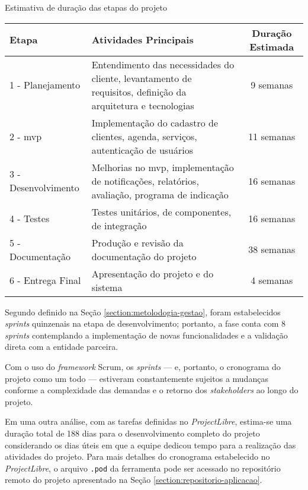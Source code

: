 \begin{quadro}[ht]
	\setlength{\tabcolsep}{5pt}
	\begin{center}
		\renewcommand{\arraystretch}{1.12} 	%
		\setlength{\tabcolsep}{4pt}      	%
		\caption{\label{frame:etapas-estimativa}Estimativa de duração das etapas do projeto}
		\begin{tabular}{|m{4cm}|m{7cm}|c|}
			\hline
			\centering\textbf{Etapa} & \centering\textbf{Atividades Principais} & \textbf{Duração Estimada} \\
			\hline
			1 - Planejamento & Entendimento das necessidades do cliente, levantamento de requisitos, definição da arquitetura e tecnologias  & 9 semanas \\
			\hline
			2 - \gls{mvp} & Implementação do cadastro de clientes, agenda, serviços, autenticação de usuários & 11 semanas \\
			\hline
			3 - Desenvolvimento & Melhorias no \gls{mvp}, implementação de notificações, relatórios, avaliação, programa de indicação  & 16 semanas \\
			\hline
			4 - Testes & Testes unitários, de componentes, de integração  & 16 semanas \\
			\hline
			5 - Documentação & Produção e revisão da documentação do projeto & 38 semanas \\
			\hline
			6 - Entrega Final & Apresentação do projeto e do sistema &  4 semanas \\
			\hline
		\end{tabular}
	\end{center}
\end{quadro}

Segundo definido na Seção \ref{section:metolodogia-gestao}, foram estabelecidos \textit{sprints} quinzenais na etapa de desenvolvimento; portanto, a fase conta com 8 \textit{sprints} contemplando a implementação de novas funcionalidades e a validação direta com a entidade parceira.

Com o uso do \textit{framework} Scrum, os \textit{sprints} --- e, portanto, o cronograma do projeto como um todo --- estiveram constantemente sujeitos a mudanças conforme a complexidade das demandas e o retorno dos \textit{stakeholders} ao longo do projeto.

Em uma outra análise, com as tarefas definidas no \emph{ProjectLibre}, estima-se uma duração total de 188 dias para o desenvolvimento completo do projeto considerando os dias úteis em que a equipe dedicou tempo para a realização das atividades do projeto. Para mais detalhes do cronograma estabelecido no \emph{ProjectLibre}, o arquivo \texttt{.pod} da ferramenta pode ser acessado no repositório remoto do projeto  apresentado na Seção \ref{section:repositorio-aplicacao}.